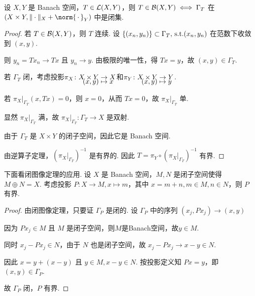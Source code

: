 \begin{theorem}[闭图像定理]
    设 $X, Y$ 是 Banach 空间，$T \in \mathcal{L}(X, Y)$，则 $T \in \mathcal{B}(X, Y) \iff \Gamma_T$ 在 $(X \times Y, \|\cdot\|_X + \norm{\,\cdot\,}_Y)$ 中是闭集.
\end{theorem}
\begin{proof}
    \fbox{$\Rightarrow$} 若 $T \in \mathcal{B}(X, Y)$，则 $T$ 连续. 设 $\{(x_n, y_n)\} \subset \Gamma_T, \operatorname{\,\text{s.t.}} (x_n, y_n)$ 在范数下收敛到 $(x, y)$.\par
    则 $y_n = Tx_n \to Tx$ 且 $y_n \to y$. 由极限的唯一性，得 $Tx = y$，故 $(x, y) \in \Gamma_T$.\par
    \fbox{$\Leftarrow$} 若 $\Gamma_T$ 闭，考虑投影$\setjot[-6]\begin{aligned}[t]
        \pi_X\colon X \times Y &\to X\\
        (x, y) &\mapsto x
    \end{aligned} $和$\setjot[-6]\begin{aligned}[t]
        \pi_Y\colon X \times Y &\to Y \\
        (x, y) &\mapsto y
    \end{aligned} $.\par
    若 $\pi_X|_{\Gamma_T}(x, Tx) = 0$，则 $x = 0$，从而 $Tx = 0$，故 $\pi_X|_{\Gamma_T}$ 单.\par
    显然 $\pi_X|_{\Gamma_T}$ 满，故 $\pi_X|_{\Gamma_T}\colon \Gamma_T \to X$ 是双射.\par
    由于 $\Gamma_T$ 是 $X \times Y$ 的闭子空间，因此它是 Banach 空间.\par
    由逆算子定理，$(\pi_X|_{\Gamma_T})^{-1}$ 是有界的.
    因此 $T = \pi_Y \circ (\pi_X|_{\Gamma_T})^{-1}$ 有界.
\end{proof}

下面看闭图像定理的应用.
设 $X$ 是 Banach 空间，$M, N$ 是闭子空间使得 $M \oplus N = X$. 考虑投影 $P\colon X \to M, x \mapsto m$，其中 $x = m + n, m \in M, n \in N$，则 $P$ 有界.
\begin{proof}
    由闭图像定理，只要证 $\Gamma_P$ 是闭的.
    设 $\Gamma_P$ 中的序列 $(x_j, Px_j) \to (x, y)$\par
    因为 $Px_j \in M$ 且 $M$ 是闭子空间，则$M$是Banach空间，故$y \in M$.\par
    同时 $x_j - Px_j \in N$，由于 $N$ 也是闭子空间，故 $x_j - Px_j \to x - y \in N$.\par
    因此 $x = y + (x - y)$ 且 $y \in M, x - y \in N$. 按投影定义知 $Px = y$，即 $(x, y) \in \Gamma_P$. \par
    故 $\Gamma_P$ 闭，$P$ 有界.
\end{proof}

